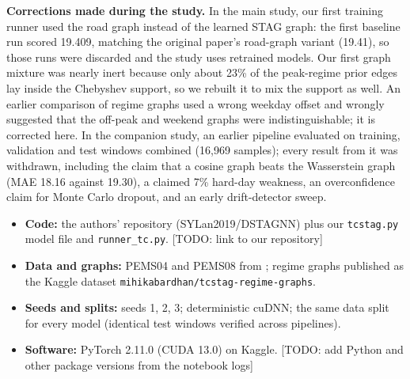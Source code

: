\documentclass[conference]{IEEEtran}
\newcommand{\todo}[1]{{\color{red}[TODO: #1]}}
\begin{document}
\textbf{Corrections made during the study.} In the main study, our first training runner used the road graph instead of the learned STAG graph: the first baseline run scored 19.409, matching the original paper's road-graph variant (19.41), so those runs were discarded and the study uses retrained models. Our first graph mixture was nearly inert because only about 23\% of the peak-regime prior edges lay inside the Chebyshev support, so we rebuilt it to mix the support as well. An earlier comparison of regime graphs used a wrong weekday offset and wrongly suggested that the off-peak and weekend graphs were indistinguishable; it is corrected here. In the companion study, an earlier pipeline evaluated on training, validation and test windows combined (16,969 samples); every result from it was withdrawn, including the claim that a cosine graph beats the Wasserstein graph (MAE 18.16 against 19.30), a claimed 7\% hard-day weakness, an overconfidence claim for Monte Carlo dropout, and an early drift-detector sweep.

\begin{itemize}
\item \textbf{Code:} the authors' repository (SYLan2019/DSTAGNN) plus our \texttt{tcstag.py} model file and \texttt{runner\_tc.py}. \todo{link to our repository}
\item \textbf{Data and graphs:} PEMS04 and PEMS08 from \cite{song2020stsgcn}; regime graphs published as the Kaggle dataset \texttt{mihikabardhan/tcstag-regime-graphs}.
\item \textbf{Seeds and splits:} seeds 1, 2, 3; deterministic cuDNN; the same data split for every model (identical test windows verified across pipelines).
\item \textbf{Software:} PyTorch 2.11.0 (CUDA 13.0) on Kaggle. \todo{add Python and other package versions from the notebook logs}
\end{itemize}
\end{document}
